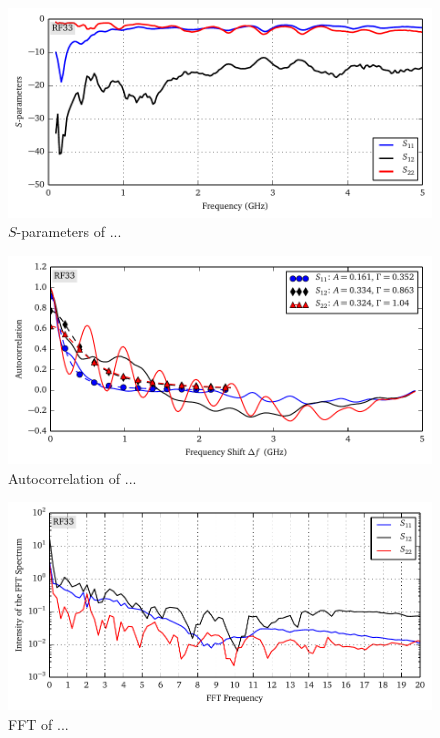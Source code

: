 \begin{figure}
 \centering
 \includegraphics{figs/active/RF33-sParameters.pdf}
 \caption{$S$-parameters of ...}
\end{figure}

\begin{figure}
 \centering
 \includegraphics{figs/active/RF33-autoCorrelation.pdf}
 \caption{Autocorrelation of ...}
\end{figure}

\begin{figure}
 \centering
 \includegraphics{figs/active/RF33-fft.pdf}
 \caption{FFT of ...}
\end{figure}


